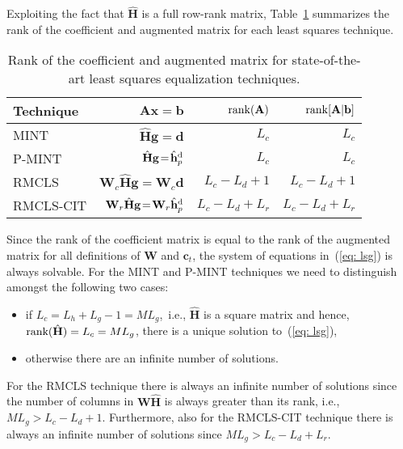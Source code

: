 \documentclass[10pt]{IEEEtran}
\begin{document}
Exploiting the fact that $\hat{\mathbf{H}}$ is a full row-rank matrix, Table~\ref{tbl: rank} summarizes the rank of the coefficient and augmented matrix for each least squares technique.
\begin{table}[t!]
  \centering
  \caption{Rank of the coefficient and augmented matrix for state-of-the-art least squares equalization techniques.}
  \label{tbl: rank}
 {\small \begin{tabular}{|l|r|r|r|}
    \hline
    Technique & $\mathbf{A}\mathbf{x} \!=\! \mathbf{b}$ & ${\rm rank}(\mathbf{A})$ & ${\rm rank}[\mathbf{A}|\mathbf{b}]$ \\
    \hline
    MINT & $\hat{\mathbf{H}}\mathbf{g} \!=\! \mathbf{d}$ & $L_c$ & $L_c$ \\
    \hline
    P-MINT & $\hat{\mathbf{H}}\mathbf{g} \!=\! \hat{\mathbf{h}}_p^{\rm d}$ & $L_c$ & $L_c$ \\
    \hline
    RMCLS & $\mathbf{W}_c\hat{\mathbf{H}}\mathbf{g} \!=\! \mathbf{W}_c\mathbf{d}$ & $L_c \!-\! L_d\!+\!1$ & $L_c \!-\!L_d\!+\!1$ \\
    \hline
    RMCLS-CIT & $\mathbf{W}_{r}\hat{\mathbf{H}}\mathbf{g} \!=\! \mathbf{W}_{r}\hat{\mathbf{h}}_p^{\rm d}$ & $L_c \!-\! L_d \!+\! L_r$ & $L_c \!- \!L_d \!+\! L_r$\\
    \hline
  \end{tabular}}
\end{table}
Since the rank of the coefficient matrix is equal to the rank of the augmented matrix for all definitions of $\mathbf{W}$ and $\mathbf{c}_t$, the system of equations in~(\ref{eq: lsg}) is always solvable.
For the MINT and P-MINT techniques we need to distinguish amongst the following two cases:
\begin{itemize}
  \item if $L_c = L_h + L_g -1 = ML_g$,~i.e., $\hat{\mathbf{H}}$ is a square matrix and hence, ${\rm rank(\hat{\mathbf{H}})} =  L_c = ML_g$, there is a unique solution to~(\ref{eq: lsg}),
  \item otherwise there are an infinite number of solutions.
\end{itemize}
For the RMCLS technique there is always an infinite number of solutions since the number of columns in $\mathbf{W}\hat{\mathbf{H}}$ is always greater than its rank, i.e., $M L_g > L_c - L_d +1$.
Furthermore, also for the RMCLS-CIT technique there is always an infinite number of solutions since $M L_g > L_c -L_d+L_r$.
\end{document}
